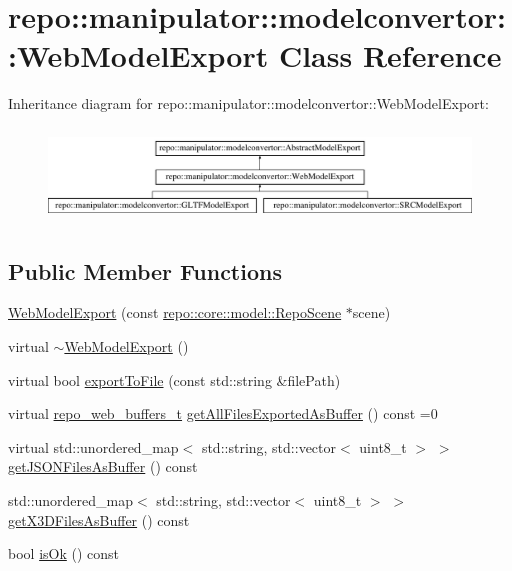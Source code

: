 \hypertarget{classrepo_1_1manipulator_1_1modelconvertor_1_1_web_model_export}{}\section{repo\+:\+:manipulator\+:\+:modelconvertor\+:\+:Web\+Model\+Export Class Reference}
\label{classrepo_1_1manipulator_1_1modelconvertor_1_1_web_model_export}
Inheritance diagram for repo\+:\+:manipulator\+:\+:modelconvertor\+:\+:Web\+Model\+Export\+:\begin{figure}[H]
\begin{center}
\leavevmode
\includegraphics[height=2.507463cm]{classrepo_1_1manipulator_1_1modelconvertor_1_1_web_model_export}
\end{center}
\end{figure}
\subsection*{Public Member Functions}
\begin{DoxyCompactItemize}
\item 
\hyperlink{classrepo_1_1manipulator_1_1modelconvertor_1_1_web_model_export_a26b2b03d3e9b1dd659058f8c21f7355d}{Web\+Model\+Export} (const \hyperlink{classrepo_1_1core_1_1model_1_1_repo_scene}{repo\+::core\+::model\+::\+Repo\+Scene} $\ast$scene)
\item 
virtual \hyperlink{classrepo_1_1manipulator_1_1modelconvertor_1_1_web_model_export_a10097ae71b25979330a9a8e5ad403e55}{$\sim$\+Web\+Model\+Export} ()
\item 
virtual bool \hyperlink{classrepo_1_1manipulator_1_1modelconvertor_1_1_web_model_export_a7ce7f209d57bf5cd48499cf3dbbb25d0}{export\+To\+File} (const std\+::string \&file\+Path)
\item 
virtual \hyperlink{structrepo__web__buffers__t}{repo\+\_\+web\+\_\+buffers\+\_\+t} \hyperlink{classrepo_1_1manipulator_1_1modelconvertor_1_1_web_model_export_ad9e20343a2e8a21fb9de2e89ba14bf05}{get\+All\+Files\+Exported\+As\+Buffer} () const =0
\item 
virtual std\+::unordered\+\_\+map$<$ std\+::string, std\+::vector$<$ uint8\+\_\+t $>$ $>$ \hyperlink{classrepo_1_1manipulator_1_1modelconvertor_1_1_web_model_export_afdbd1aa2c77d6493c038cbd52ebcf185}{get\+J\+S\+O\+N\+Files\+As\+Buffer} () const 
\item 
std\+::unordered\+\_\+map$<$ std\+::string, std\+::vector$<$ uint8\+\_\+t $>$ $>$ \hyperlink{classrepo_1_1manipulator_1_1modelconvertor_1_1_web_model_export_acde7b100e2cd2654853a20c0e39304a6}{get\+X3\+D\+Files\+As\+Buffer} () const 
\item 
bool \hyperlink{classrepo_1_1manipulator_1_1modelconvertor_1_1_web_model_export_ac284fe40fa97587feb44e9e2fb2a7b15}{is\+Ok} () const 
\end{DoxyCompactItemize}
